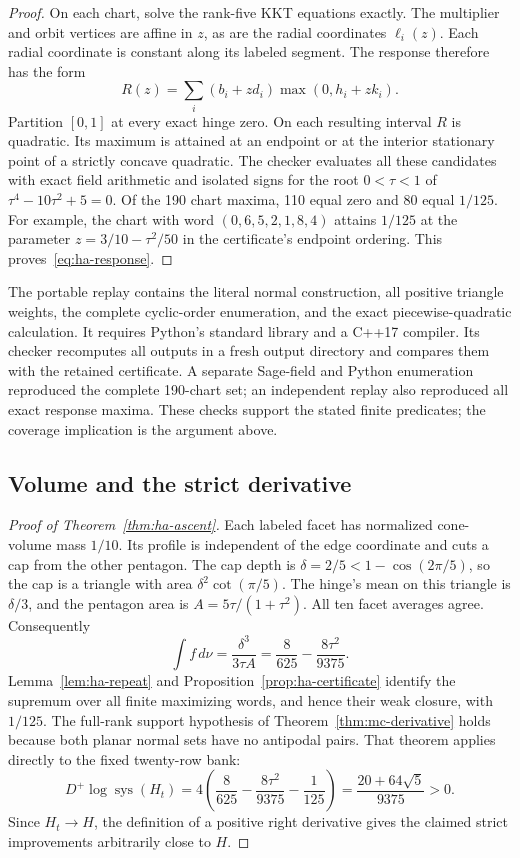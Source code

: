\begin{proof}
On each chart, solve the rank-five KKT equations exactly. The multiplier
and orbit vertices are affine in $z$, as are the radial coordinates
$\ell_i(z)$. Each radial coordinate is constant along its labeled segment.
The response therefore has the form
\[
 R(z)=\sum_i(b_i+zd_i)\max(0,h_i+zk_i).
\]
Partition $[0,1]$ at every exact hinge zero. On each resulting interval
$R$ is quadratic. Its maximum is attained at an endpoint or at the interior
stationary point of a strictly concave quadratic. The checker evaluates all
these candidates with exact field arithmetic and isolated signs for the
root $0<\tau<1$ of $\tau^4-10\tau^2+5=0$.
Of the 190 chart maxima, 110 equal zero and 80 equal $1/125$.
For example, the chart with word $(0,6,5,2,1,8,4)$ attains $1/125$ at
the parameter $z=3/10-\tau^2/50$ in the certificate's endpoint ordering.
This proves~\eqref{eq:ha-response}.
\end{proof}

The portable replay contains the literal normal construction, all positive
triangle weights, the complete cyclic-order enumeration, and the exact
piecewise-quadratic calculation. It requires Python's standard library and
a C++17 compiler. Its checker recomputes all outputs in a fresh output
directory and compares them with the retained certificate. A separate
Sage-field and Python enumeration reproduced the complete 190-chart set;
an independent replay also reproduced all exact response maxima. These
checks support the stated finite predicates; the coverage implication is
the argument above.

\subsection{Volume and the strict derivative}

\begin{proof}[Proof of Theorem~\ref{thm:ha-ascent}]
Each labeled facet has normalized cone-volume mass $1/10$. Its profile is
independent of the edge coordinate and cuts a cap from the other pentagon.
The cap depth is $\delta=2/5<1-\cos(2\pi/5)$, so the cap is a triangle
with area $\delta^2\cot(\pi/5)$. The hinge's mean on this triangle is
$\delta/3$, and the pentagon area is $A=5\tau/(1+\tau^2)$. All ten facet
averages agree. Consequently
\begin{equation}\label{eq:ha-volume}
 \int f\,d\nu=\frac{\delta^3}{3\tau A}
             =\frac8{625}-\frac{8\tau^2}{9375}.
\end{equation}
Lemma~\ref{lem:ha-repeat} and Proposition~\ref{prop:ha-certificate} identify
the supremum over all finite maximizing words, and hence their weak closure,
with $1/125$. The full-rank support hypothesis of
Theorem~\ref{thm:mc-derivative} holds because both planar normal sets have no
antipodal pairs. That theorem applies directly to the fixed twenty-row bank:
\[
 D^+\log\operatorname{sys}(H_t)
 =4\left(\frac8{625}-\frac{8\tau^2}{9375}-\frac1{125}\right)
 =\frac{20+64\sqrt5}{9375}>0.
\]
Since $H_t\to H$, the definition of a positive right derivative gives the
claimed strict improvements arbitrarily close to $H$.
\end{proof}
